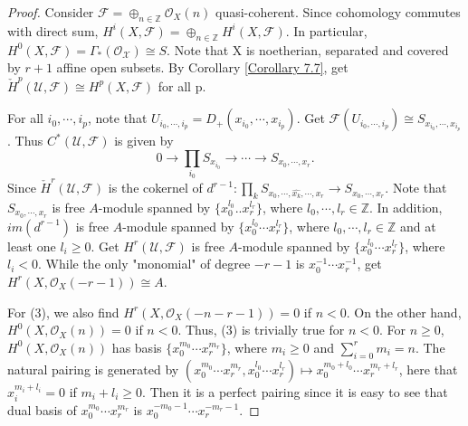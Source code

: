 \documentclass{ctexart}
\begin{document}
\begin{proof}
    Consider $\mathcal{F} = \oplus_{n\in \mathbb{Z}} \mathcal{O}_{X}(n)$ quasi-coherent.
    Since cohomology commutes with direct sum, $H^{i}(X, \mathcal{F}) = \oplus_{n\in \mathbb{Z}} H^{i}(X, \mathcal{F})$.
    In particular, $H^{0}(X, \mathcal{F}) = \Gamma_{\ast}(\mathcal{O_{X}}) \cong S$.
    Note that X is noetherian, separated and covered by $r + 1$ affine open subsets.
    By Corollary \ref{Corollary 7.7}, get $\check{H}^{p}(\mathcal{U}, \mathcal{F}) \cong H^{p}(X, \mathcal{F})$ for all p.
    \par
    For all $i_{0}, \cdots, i_{p}$, note that $U_{i_{0}, \cdots, i_{p}} = D_{+}(x_{i_{0}}, \cdots, x_{i_{p}})$.
    Get $\mathcal{F}(U_{i_{0}, \cdots, i_{p}}) \cong S_{x_{i_{0}}, \cdots, x_{i_{p}}}$. 
    Thus $C^{\ast}(\mathcal{U}, \mathcal{F})$ is given by 
    \begin{equation*}
        0 \longrightarrow \prod_{i_{0}} S_{x_{i_{0}}} \longrightarrow \cdots \longrightarrow S_{x_{0}, \cdots, x_{r}}.
    \end{equation*}
    Since $\check{H}^{r}(\mathcal{U}, \mathcal{F})$ is the cokernel of $d^{r - 1}: \prod_{k} S_{x_{0}, \cdots, \widehat{x_{k}}, \cdots, x_{r}} \longrightarrow S_{x_{0}, \cdots, x_{r}}$.
    Note that $S_{x_{0}, \cdots, x_{r}}$ is free $A$-module spanned by $\{x_{0}^{l_{0}}..x_{r}^{l_{r}}\}$, where $l_{0}, \cdots, l_{r}\in \mathbb{Z}$.
    In addition, $im(d^{r - 1})$ is free $A$-module spanned by $\{x_{0}^{l_{0}}\cdots x_{r}^{l_{r}}\}$, where $l_{0}, \cdots, l_{r}\in \mathbb{Z}$ and at least one $l_{i} \ge 0$.
    Get $H^{r}(\mathcal{U}, \mathcal{F})$ is free $A$-module spanned by $\{x_{0}^{l_{0}}\cdots x_{r}^{l_{r}}\}$, where $l_{i} < 0$.
    While the only "monomial" of degree $-r - 1$ is $x_{0}^{-1}\cdots x_{r}^{-1}$, get $H^{r}(X, \mathcal{O}_{X}(-r - 1)) \cong A$.
    \par
    For (3), we also find $H^{r}(X, \mathcal{O}_{X}(-n - r - 1)) = 0$ if $n < 0$.
    On the other hand, $H^{0}(X, \mathcal{O}_{X}(n)) = 0$ if $n < 0$.
    Thus, (3) is trivially true for $n < 0$.
    For $n \ge 0$, $H^{0}(X, \mathcal{O}_{X}(n))$ has basis $\{x_{0}^{{m_{0}}}\cdots x_{r}^{m_{r}}\}$,
    where $m_{i} \ge 0$ and $\sum_{i = 0}^{r} m_{i} = n$.
    The natural pairing is generated by $(x_{0}^{m_{0}}\cdots x_{r}^{m_{r}}, x_{0}^{l_{0}}\cdots x_{r}^{l_{r}}) \longmapsto x_{0}^{m_{0} + l_{0}}\cdots x_{r}^{m_{r} + l_{r}}$,
    here that $x_{i}^{m_{i} + l_{i}} = 0$ if $m_{i} + l_{i} \ge 0$.
    Then it is a perfect pairing since it is easy to see that dual basis of $x_{0}^{m_{0}}\cdots x_{r}^{m_{r}}$ is $x_{0}^{-m_{0} - 1}\cdots x_{r}^{-m_{r} - 1}$.

\end{proof}
\end{document}
